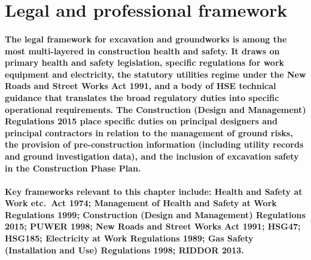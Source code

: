 
\section{Legal and professional framework}

\paragraph{The legal framework for excavation and groundworks is among the most multi-layered in construction health and safety. It draws on primary health and safety legislation, specific regulations for work equipment and electricity, the statutory utilities regime under the New Roads and Street Works Act 1991, and a body of HSE technical guidance that translates the broad regulatory duties into specific operational requirements. The Construction (Design and Management) Regulations 2015 place specific duties on principal designers and principal contractors in relation to the management of ground risks, the provision of pre-construction information (including utility records and ground investigation data), and the inclusion of excavation safety in the Construction Phase Plan.}

\paragraph{Key frameworks relevant to this chapter include: Health and Safety at Work etc.\ Act 1974; Management of Health and Safety at Work Regulations 1999; Construction (Design and Management) Regulations 2015; PUWER 1998; New Roads and Street Works Act 1991; HSG47; HSG185; Electricity at Work Regulations 1989; Gas Safety (Installation and Use) Regulations 1998; RIDDOR 2013.}

